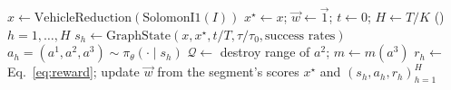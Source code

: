 \begin{algorithm}[t]
\caption{\sgalns{}: one episode (actions sampled in training, greedy at deployment)}\label{alg:sg}
$x\leftarrow\mathrm{VehicleReduction}(\mathrm{SolomonI1}(I))$\;
$x^\star\leftarrow x$; $\vec w\leftarrow\vec 1$; $t\leftarrow0$; $H\leftarrow T/K$\;
\For(){$h=1,\dots,H$}{
  $s_h\leftarrow\mathrm{GraphState}(x,x^\star,t/T,\tau/\tau_0,\text{success rates})$\;
  $a_h=(a^1,a^2,a^3)\sim\pi_\theta(\cdot\mid s_h)$\;
  $\mathcal Q\leftarrow$ destroy range of $a^2$; $m\leftarrow m(a^3)$\;
  $r_h\leftarrow$ Eq.~\eqref{eq:reward}; update $\vec w$ from the segment's scores\;
}
\Return $x^\star$ and $(s_h,a_h,r_h)_{h=1}^{H}$\;
\end{algorithm}
